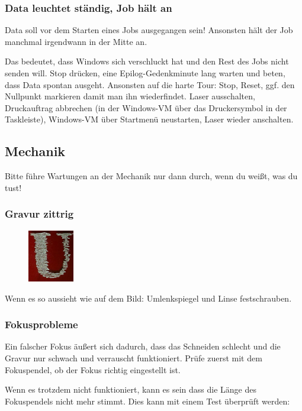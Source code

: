 \documentclass{\basedir/fablab-document}
\begin{document}
\subsubsection{Data leuchtet ständig, Job hält an}
Data soll vor dem Starten eines Jobs ausgegangen sein! Ansonsten hält der Job manchmal irgendwann in der Mitte an.

Das bedeutet, dass Windows sich verschluckt hat und den Rest des Jobs nicht senden will. Stop drücken, eine Epilog-Gedenkminute lang warten und beten, dass Data spontan ausgeht. Ansonsten auf die harte Tour: Stop, Reset, ggf. den Nullpunkt markieren damit man ihn wiederfindet. Laser ausschalten, Druckauftrag abbrechen (in der Windows-VM über das Druckersymbol in der Taskleiste), Windows-VM über Startmenü neustarten, Laser wieder anschalten.

\subsection{Mechanik}
Bitte führe Wartungen an der Mechanik nur dann durch, wenn du weißt, was du tust!

\subsubsection{Gravur zittrig}
\begin{figure}
  \vspace{-50pt} %
  \includegraphics[width=2cm]{./img/fehler-umlenkspiegel.png}
  \vspace{-20pt} %
\end{figure}
 Wenn es so aussieht wie auf dem Bild: Umlenkspiegel und Linse festschrauben. 

\subsubsection{Fokusprobleme}
Ein falscher Fokus äußert sich dadurch, dass das Schneiden schlecht und die Gravur nur schwach und verrauscht funktioniert. Prüfe zuerst mit dem Fokuspendel, ob der Fokus richtig eingestellt ist.

Wenn es trotzdem nicht funktioniert, kann es sein dass die Länge des Fokuspendels nicht mehr stimmt. Dies kann mit einem Test überprüft werden:
\end{document}
